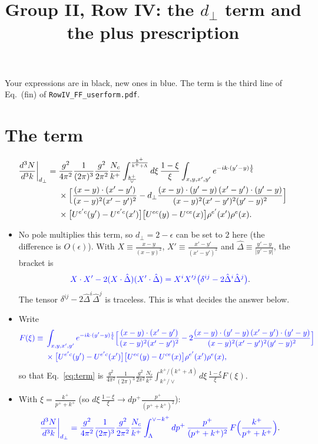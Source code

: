 \documentclass[10pt]{article}
\title{Group II, Row IV: the $d_\perp$ term and the plus prescription}
\date{}
\numberwithin{equation}{section}
\newcommand{\Dh}{\hat\Delta}
\newcommand{\new}[1]{{\color{blue}#1}}
\newcommand{\pre}{\frac{g^{2}}{4\pi^{2}}\frac{1}{(2\pi)^{3}}\frac{g^{2}}{2\pi^{2}}\frac{N_{c}}{k^{+}}}
\newcommand{\XX}{\frac{(x-y)\cdot(x'-y')}{(x-y)^{2}(x'-y')^{2}}}
\newcommand{\XD}{\frac{(x-y)\cdot(y'-y)\,(x'-y')\cdot(y'-y)}{(x-y)^{2}(x'-y')^{2}(y'-y)^{2}}}
\newcommand{\ph}{e^{-ik\cdot(y'-y)\frac{1}{\xi}}}
\newcommand{\Ucol}{\big[U^{e'c}(y')-U^{e'c}(x')\big]\big[U^{ec}(y)-U^{ce}(x)\big]\rho^{e'}(x')\rho^{e}(x)}
\begin{document}
\maketitle
\noindent Your expressions are in black, new ones in \new{blue}. The term is the third line of Eq.~(fin) of \texttt{RowIV\_FF\_userform.pdf}.

\section{The term}\label{sec:term}
\begin{align}
\frac{d^3N}{d^3k}\bigg|_{d_\perp}={}&\pre\int_{\frac{k^{+}}{\vee}}^{\frac{k^{+}}{k^{+}+\Lambda}}d\xi\,\frac{1-\xi}{\xi}\int_{x,y,x',y'}\ph\notag\\
&\times\Big[\XX-d_\perp\XD\Big]\notag\\
&\times\Ucol .
\label{eq:term}
\end{align}
\begin{itemize}
\item No pole multiplies this term, so $d_\perp=2-\epsilon$ can be set to $2$ here (the difference is $O(\epsilon)$). With $X\equiv\frac{x-y}{(x-y)^2}$, $X'\equiv\frac{x'-y'}{(x'-y')^2}$ and $\Dh\equiv\frac{y'-y}{|y'-y|}$, the bracket is
\begin{equation}
\new{X\cdot X'-2(X\cdot\Dh)(X'\cdot\Dh)=X^iX'^j\big(\delta^{ij}-2\Dh^i\Dh^j\big)}.
\end{equation}
The tensor $\delta^{ij}-2\Dh^i\Dh^j$ is traceless. This is what decides the answer below.
\item Write
\begin{equation}
\new{\begin{aligned}F(\xi)\equiv{}&\int_{x,y,x',y'}\ph\Big[\XX-2\XD\Big]\\&\times\Ucol,\end{aligned}}
\end{equation}
so that Eq.~\eqref{eq:term} is $\pre\int_{k^+/\vee}^{k^+/(k^++\Lambda)}d\xi\,\frac{1-\xi}{\xi}F(\xi)$.
\item With $\xi=\frac{k^+}{p^++k^+}$ (so $d\xi\,\frac{1-\xi}{\xi}\to dp^+\frac{p^+}{(p^++k^+)^2}$):
\begin{equation}
\new{\frac{d^3N}{d^3k}\bigg|_{d_\perp}=\pre\int_{\Lambda}^{\vee-k^+}dp^+\,\frac{p^+}{(p^++k^+)^2}\,F\Big(\frac{k^+}{p^++k^+}\Big)}.
\label{eq:pplus}
\end{equation}
\end{itemize}
\end{document}
